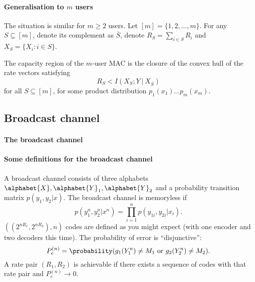 \documentclass[a4paper, 11pt, openany]{book}
\begin{document}
\paragraph{Generalisation to $m$ users}
The situation is similar for $m \ge 2$ users. Let $[m] = \{1, 2, \dots, m\}$. For any $S \subseteq [m]$, denote its complement as $\bar{S}$, denote $R_S = \sum_{i \in S} R_i$ and $X_S = \{ X_i: i \in S \}$.

\begin{theorem}
The capacity region of the $m$-user MAC is the closure of the convex hull of the rate vectors satisfying
\[
	R_S < I \left(  X_S; Y \ | \ X_{\bar{S}}  \right)
\]
for all $S \subseteq [m]$, for some product distribution $p_1(x_1) \dots p_m(x_m)$.
\end{theorem}


\subsection{Broadcast channel}

\paragraph{The broadcast channel}


\begin{center}
\end{center}



\paragraph{Some definitions for the broadcast channel}
A broadcast channel consists of three alphabets $\alphabet{X}, \alphabet{Y}_1, \alphabet{Y}_2$ and a probability transition matrix $p(y_1, y_2 | x)$. The broadcast channel is memoryless if
\[
	p(y_1^n, y_2^n | x^n) = \prod_{i=1}^n p(y_{1i}, y_{2i} | x_i).
\]
$((2^{nR_1}, 2^{nR_2}), n)$ codes are defined as you might expect (with one encoder and two decoders this time). The probability of error is ``disjunctive'':
\[
	P_e^{(n)} = \probability( g_1(Y_1^n) \ne M_1 \text{ or } g_2(Y_2^n) \ne M_2 ).
\]
A rate pair $(R_1, R_2)$ is achievable if there exists a sequence of codes with that rate pair and $P_e^{(n)} \to 0$.
\end{document}
